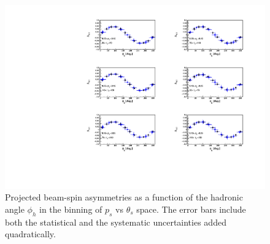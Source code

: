 \begin{figure}[htb]
  \centering
    \includegraphics[width=1.1\textwidth,clip]{figs_epngamma/pdf/epngamma_BSA_incoherent_Phi.pdf}
  \caption{Projected beam-spin asymmetries as a function of the hadronic angle 
   $\phi_h$ in the binning of $p_s$ vs $\theta_s$ space. The error bars include 
   both the statistical and the systematic uncertainties added quadratically.
   \label{fig:alu_exclusive}}
\end{figure}



